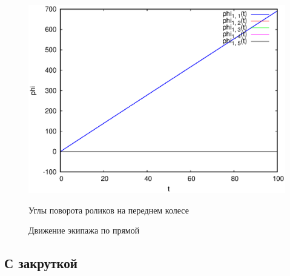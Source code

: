 \begin{figure}[h]
{        \includegraphics[scale=0.33]{pic/straight_100/phi1.eps}
        \caption{Углы поворота роликов на переднем колесе}
        \label{fig:straight_100_phi1}
    }
    \hspace{10pt}
    \caption{Движение экипажа по прямой}
\end{figure}
\label{fig:straight}

\newpage

\subsection{С закруткой}

